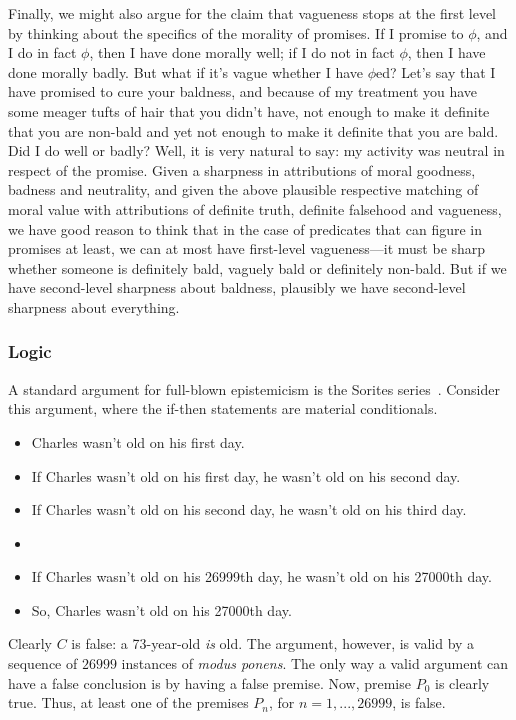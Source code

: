 Finally, we might also argue for the claim that vagueness stops at the first level by thinking about the specifics of the morality of promises. If I promise
to $\phi$, and I do in fact $\phi$, then I have done morally well; if I do not in fact $\phi$, then I have done morally badly.
But what if it's vague whether I have $\phi$ed? Let's say that I have promised to cure your baldness, and because of my treatment
you have some meager tufts of hair that you didn't have, not enough to make it definite that you are non-bald and yet not enough
to make it definite that you are bald. Did I do well or badly? Well, it is very natural to say: my activity was neutral in respect
of the promise. Given a sharpness in attributions of moral goodness, badness and neutrality, and given the above plausible respective matching
of moral value with attributions of definite truth, definite falsehood and vagueness, we have good reason to think that in the case
of predicates that can figure in promises at least, we can at most have first-level vagueness---it must be sharp whether someone is
definitely bald, vaguely bald or definitely non-bald. But if we have second-level sharpness about baldness, plausibly we have 
second-level sharpness about everything.

\subsubsection{Logic}
A standard argument for full-blown epistemicism is the Sorites series~.
Consider this argument, where the if-then statements are material conditionals.
\begin{itemize}
\item[$(P_0)$] Charles wasn't old on his first day.
\item[$(P_1)$] If Charles wasn't old on his first day, he wasn't old on his second day.
\item[$(P_2)$] If Charles wasn't old on his second day, he wasn't old on his third day.
\item[...] \ {}
\item[$(P_{26999})$] If Charles wasn't old on his 26999th day, he wasn't old on his 27000th day.
\item[$(C)$] So, Charles wasn't old on his 27000th day.
\end{itemize}

Clearly $C$ is false: a 73-year-old \textit{is} old. The argument, however, is valid by 
a sequence of $26999$ instances of \textit{modus ponens}. The only way a valid argument
can have a false conclusion is by having a false premise. Now, premise $P_0$ is clearly
true. Thus, at least one of the premises $P_n$, for $n=1,...,26999$, is false. 

